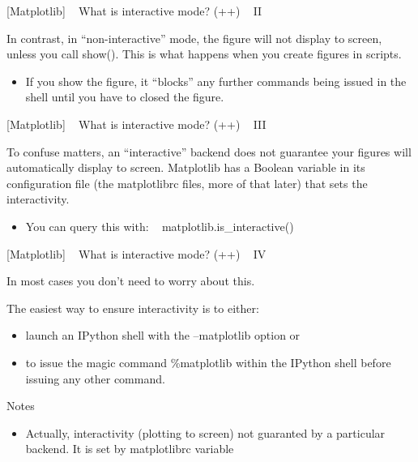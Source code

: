 \documentclass{article}
\begin{document}
    {[}Matplotlib{]} ~ What is interactive mode? (++) ~ II

In contrast, in ``non-interactive'' mode, the figure will not display to
screen, unless you call show(). This is what happens when you create
figures in scripts.

\begin{itemize}
\itemsep1pt\parskip0pt
\item
  If you show the figure, it ``blocks'' any further commands being
  issued in the shell until you have to closed the figure.
\end{itemize}

    {[}Matplotlib{]} ~ What is interactive mode? (++) ~ III

To confuse matters, an ``interactive'' backend does not guarantee your
figures will automatically display to screen. Matplotlib has a Boolean
variable in its configuration file (the matplotlibrc files, more of that
later) that sets the interactivity.

\begin{itemize}
\itemsep1pt\parskip0pt
\item
  You can query this with: ~ matplotlib.is\_interactive()
\end{itemize}

    {[}Matplotlib{]} ~ What is interactive mode? (++) ~ IV

In most cases you don't need to worry about this.

The easiest way to ensure interactivity is to either:

\begin{itemize}
\item
  launch an IPython shell with the --matplotlib option or
\item
  to issue the magic command \%matplotlib within the IPython shell
  before issuing any other command.
\end{itemize}

    Notes

\begin{itemize}
\itemsep1pt\parskip0pt
\item
  Actually, interactivity (plotting to screen) not guaranted by a
  particular backend. It is set by matplotlibrc variable
\end{itemize}
\end{document}
